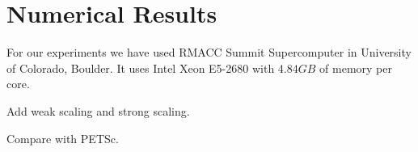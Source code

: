 \section{Numerical Results}
\label{sec:results}

For our experiments we have used RMACC Summit Supercomputer in University of Colorado, Boulder. It uses Intel Xeon E5-2680 with $4.84GB$ of memory per core.

Add weak scaling and strong scaling.

Compare with PETSc.

